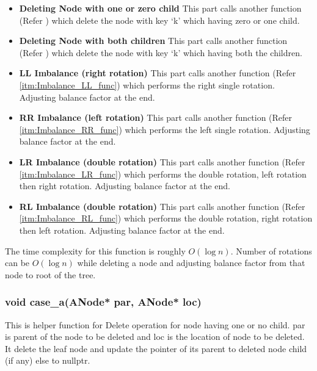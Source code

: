 \documentclass{article}
\begin{document}
\begin{itemize}
    \item \textbf{Deleting Node with one or zero child}\newline
	This part calls another function (Refer ) which delete the node with key `k' which having zero or one child.
	\item \textbf{Deleting Node with both children}\newline
	This part calls another function (Refer ) which delete the node with key `k' which having both the children.
	\item \textbf{LL Imbalance (right rotation)}\newline
	This part calls another function (Refer \ref{itm:Imbalance_LL_func}) which performs the right single rotation. Adjusting balance factor at the end.
	\item \textbf{RR Imbalance (left rotation)}\newline
	This part calls another function (Refer \ref{itm:Imbalance_RR_func}) which performs the left single rotation. Adjusting balance factor at the end.
	\item \textbf{LR Imbalance (double rotation)}\newline
	This part calls another function (Refer \ref{itm:Imbalance_LR_func}) which performs the double rotation, left rotation then right rotation. Adjusting balance factor at the end.
	\item \textbf{RL Imbalance (double rotation)}\newline
	This part calls another function (Refer \ref{itm:Imbalance_RL_func}) which performs the double rotation, right rotation then left rotation. Adjusting balance factor at the end.
\end{itemize}
The time complexity for this function is roughly $O(\log n)$. Number of rotations can be $O(\log n)$ while deleting a node and adjusting balance factor from that node to root of the tree.

\subsubsection{void case\_a(ANode* par, ANode* loc)}
\label{case_a}
This is helper function for Delete operation for node having one or no child.
par is parent of the node to be deleted and loc is the location of node to be deleted.
It delete the leaf node and update the pointer of its parent to deleted node child (if any) else to nullptr.
\end{document}
